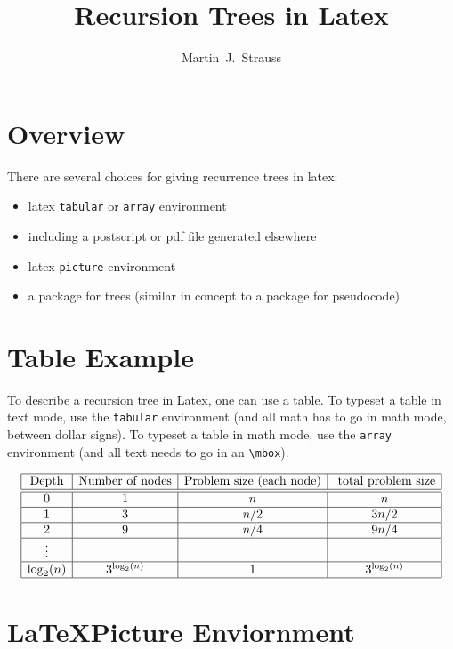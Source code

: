\documentclass{article}
\title{Recursion Trees in Latex}
\author{Martin~J.~Strauss}
\begin{document}
\maketitle

\section{Overview}

There are several choices for giving recurrence trees in latex:
\begin{itemize}
\item latex \verb|tabular| or \verb|array| environment
\item including a postscript or pdf file generated elsewhere
\item latex \verb|picture| environment
\item a package for trees (similar in concept to a package for
  pseudocode)
\end{itemize}


\section{Table Example}

To describe a recursion tree in Latex, one can use a table.  To
typeset a table in text mode, use the \verb|tabular| environment (and
all math has to go in math mode, between dollar signs).  To typeset a
table in math mode, use the \verb|array| environment (and all text needs to
go in an \verb|\mbox|).

\[
\begin{array}{|c|c|c|c|}  	%
\hline				%
\mbox{Depth} & \mbox{Number of nodes} & \mbox{Problem size (each node)} & \mbox{ total problem size}\\
\hline\hline
  0       & 1             &  n   & n\\
\hline
  1       & 3             & n/2  & 3n/2\\
\hline
  2       & 9             & n/4  & 9n/4\\
\hline
 \vdots & & & \\
\hline
\log_2(n) & 3^{\log_2(n)} & 1    & 3^{\log_2(n)}\\
\hline
\end{array}
\]

\section{\LaTeX Picture Enviornment}
 
\end{document}
